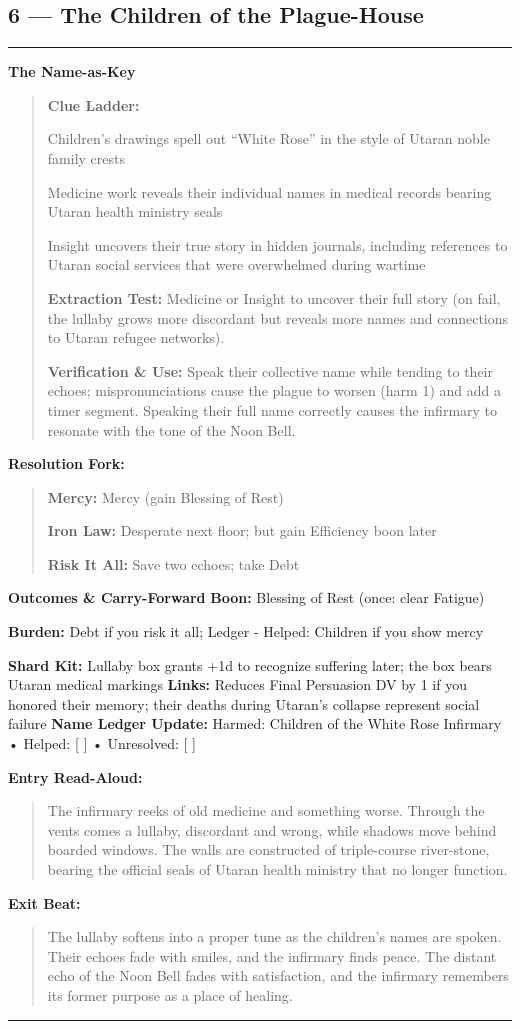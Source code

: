 \documentclass[18pt, letterpaper, twoside]{article}
\newenvironment{floorbox}[1]{%
    \begin{center}
    \begin{minipage}{0.95\textwidth}
    \subsection*{#1}
    \vspace{-0.5em}
    \rule{\textwidth}{0.5pt}
    \vspace{0.5em}
}{%
    \vspace{0.5em}
    \rule{\textwidth}{0.5pt}
    \end{minipage}
    \end{center}
}
\newenvironment{gmnote}[1]{%
    \vspace{0.5em}
    \noindent\textbf{#1}
    \begin{quote}
}{%
    \end{quote}
    \vspace{0.5em}
}
\newenvironment{resolutionbox}{%
    \vspace{0.5em}
    \noindent\textbf{Resolution Fork:}
    \begin{quote}
}{%
    \end{quote}
    \vspace{0.5em}
}
\newenvironment{boxedtext}[1]{%
    \vspace{0.5em}
    \noindent\textbf{#1}
    \begin{quote}
}{%
    \end{quote}
    \vspace{0.5em}
}
\newcommand{\boon}[1]{\noindent\textbf{Boon:} #1\par}
\newcommand{\burden}[1]{\noindent\textbf{Burden:} #1\par}
\newcommand{\entrytext}[1]{\begin{boxedtext}{Entry Read-Aloud:} #1 \end{boxedtext}}
\newcommand{\exittext}[1]{\begin{boxedtext}{Exit Beat:} #1 \end{boxedtext}}
\begin{document}
\begin{floorbox}{6 --- The Children of the Plague-House}
\begin{gmnote}{The Name-as-Key}
\textbf{Clue Ladder:}
\begin{description}[leftmargin=*, style=unboxed]
    \item[Gentle Nudge:] Children's drawings spell out ``White Rose'' in the style of Utaran noble family crests
    \item[Actionable Lead:] Medicine work reveals their individual names in medical records bearing Utaran health ministry seals
    \item[Aha! Proof:] Insight uncovers their true story in hidden journals, including references to Utaran social services that were overwhelmed during wartime
\end{description}

\textbf{Extraction Test:} Medicine or Insight to uncover their full story (on fail, the lullaby grows more discordant but reveals more names and connections to Utaran refugee networks).

\textbf{Verification \& Use:} Speak their collective name while tending to their echoes; mispronunciations cause the plague to worsen (harm 1) and add a timer segment. Speaking their full name correctly causes the infirmary to resonate with the tone of the Noon Bell.
\end{gmnote}

\begin{resolutionbox}
\textbf{Mercy:} Mercy (gain Blessing of Rest)

\textbf{Iron Law:} Desperate next floor; but gain Efficiency boon later

\textbf{Risk It All:} Save two echoes; take Debt
\end{resolutionbox}

\textbf{Outcomes \& Carry-Forward}
\boon{Blessing of Rest (once: clear Fatigue)}
\burden{Debt if you risk it all; Ledger - Helped: Children if you show mercy}
\textbf{Shard Kit:} Lullaby box grants +1d to recognize suffering later; the box bears Utaran medical markings
\textbf{Links:} Reduces Final Persuasion DV by 1 if you honored their memory; their deaths during Utaran's collapse represent social failure
\textbf{Name Ledger Update:} Harmed: Children of the White Rose Infirmary • Helped: [ ] • Unresolved: [ ]

\entrytext{The infirmary reeks of old medicine and something worse. Through the vents comes a lullaby, discordant and wrong, while shadows move behind boarded windows. The walls are constructed of triple-course river-stone, bearing the official seals of Utaran health ministry that no longer function.}

\exittext{The lullaby softens into a proper tune as the children's names are spoken. Their echoes fade with smiles, and the infirmary finds peace. The distant echo of the Noon Bell fades with satisfaction, and the infirmary remembers its former purpose as a place of healing.}
\end{floorbox}
\end{document}
